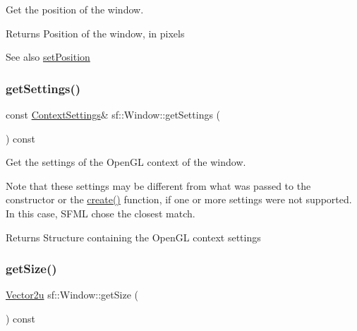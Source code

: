 Get the position of the window. 

\begin{DoxyReturn}{Returns}
Position of the window, in pixels
\end{DoxyReturn}
\begin{DoxySeeAlso}{See also}
\hyperlink{classsf_1_1_window_a6c4078bfbf61c29bfc4b4732ce764f17}{set\+Position} 
\end{DoxySeeAlso}
\mbox{\label{classsf_1_1_window_ae5b8065e92bbd0408e1fd8328e80d7d1}} 
\subsubsection{\texorpdfstring{get\+Settings()}{getSettings()}}
{\footnotesize\ttfamily const \hyperlink{structsf_1_1_context_settings}{Context\+Settings}\& sf\+::\+Window\+::get\+Settings (\begin{DoxyParamCaption}{ }\end{DoxyParamCaption}) const}



Get the settings of the Open\+GL context of the window. 

Note that these settings may be different from what was passed to the constructor or the \hyperlink{classsf_1_1_window_a30e6edf2162f8dbff61023b9de5d961d}{create()} function, if one or more settings were not supported. In this case, S\+F\+ML chose the closest match.

\begin{DoxyReturn}{Returns}
Structure containing the Open\+GL context settings 
\end{DoxyReturn}
\mbox{\label{classsf_1_1_window_a3969926741cbe83d7f9eeaf5333d4e71}} 
\subsubsection{\texorpdfstring{get\+Size()}{getSize()}}
{\footnotesize\ttfamily \hyperlink{classsf_1_1_vector2}{Vector2u} sf\+::\+Window\+::get\+Size (\begin{DoxyParamCaption}{ }\end{DoxyParamCaption}) const}



